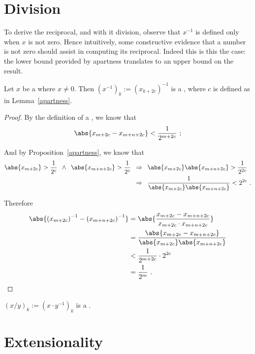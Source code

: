 \documentclass[leqno]{report}
\begin{document}
\section{Division}

To derive the reciprocal, and with it division, observe that $x^{-1}$ is defined only when $x$ is not zero. Hence intuitively, some constructive evidence that a number is not zero should assist in computing its reciprocal. Indeed this is this the case: the lower bound provided by apartness translates to an upper bound on the result.

\begin{Proposition}[Reciprocal]
    Let $x$ be a \FCCS{} where $x \neq 0$. Then $\left(x^{-1}\right)_k := \left(x_{k+2c}\right)^{-1}$ is a \FCCS, where $c$ is defined as in Lemma~\ref{apartness}.
\end{Proposition}

\begin{proof}
    By the definition of a \FCCS, we know that
    \[
        \abs{x_{m+2c} - x_{m+n+2c}} < \frac{1}{2^{m+2c}} \ ;
    \]

    And by Proposition~\ref{apartness}, we know that
    \begin{align*}
        \abs{x_{m+2c}} > \frac{1}{2^c} \enspace\wedge\enspace
        \abs{x_{m+n+2c}} > \frac{1}{2^c}
        \enspace&\Rightarrow\enspace
        \abs{x_{m+2c}} \abs{x_{m+n+2c}} > \frac{1}{2^{2c}} \\
        &\Rightarrow\enspace
        \frac{1}{\abs{x_{m+2c}} \abs{x_{m+n+2c}}} < 2^{2c} \ .
    \end{align*}

    Therefore
    \begin{align*}
        \abs{\left(x_{m+2c}\right)^{-1} - \left(x_{m+n+2c}\right)^{-1}}
        &= \abs{\frac{x_{m+2c} - x_{m+n+2c}}{x_{m+2c} \cdot x_{m+n+2c}}} \\
        &= \frac{\abs{x_{m+2c} - x_{m+n+2c}}}{\abs{x_{m+2c}} \abs{x_{m+n+2c}}} \\
        &< \frac{1}{2^{m+2c}} \cdot 2^{2c} \\
        &= \frac{1}{2^m} \ . \qedhere
    \end{align*}
\end{proof}

\begin{Corollary}[Division]
    $(x/y)_k := \left(x \cdot y^{-1}\right)_k$ is a \FCCS.
\end{Corollary}

\section{Extensionality}
\end{document}
